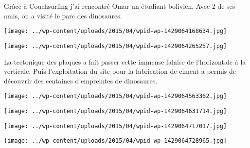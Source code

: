  Grâce à Couchsurfing j'ai rencontré Omar un étudiant bolivien. Avec 2 de ses amis, on a visité le parc des dinosaures.
\begin{center} \texttt{[image: ../wp-content/uploads/2015/04/wpid-wp-1429064168634.jpg]} \end{center}
\begin{center} \texttt{[image: ../wp-content/uploads/2015/04/wpid-wp-1429064265257.jpg]} \end{center}

 La tectonique des plaques a fait passer cette immense falaise de l'horizontale à la verticale. Puis l'exploitation du site pour la fabrication de ciment a permis de découvrir des centaines d'empreintes de dinosaures. 
\begin{center} \texttt{[image: ../wp-content/uploads/2015/04/wpid-wp-1429064563362.jpg]} \end{center}
\begin{center} \texttt{[image: ../wp-content/uploads/2015/04/wpid-wp-1429064631714.jpg]} \end{center}
\begin{center} \texttt{[image: ../wp-content/uploads/2015/04/wpid-wp-1429064717017.jpg]} \end{center}
\begin{center} \texttt{[image: ../wp-content/uploads/2015/04/wpid-wp-1429064728965.jpg]} \end{center}
